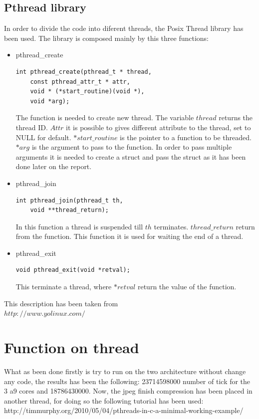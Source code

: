 \documentclass[journal]{IEEEtran}
\begin{document}
\subsection{Pthread library}
In order to divide the code into diferent threads, the Posix Thread library has been used.
The library is composed mainly by this three functions:
\begin{itemize}
	\item pthread\_create	
\begin{lstlisting}
int pthread_create(pthread_t * thread,
	const pthread_attr_t * attr,
	void * (*start_routine)(void *), 
	void *arg);
\end{lstlisting}

The function is needed to create new thread. 
The variable \(thread\) returns the thread ID. \(Attr\) it is possible to gives different attribute to the thread, set to NULL for default.
\(*start\_routine\) is the pointer to a function to be threaded. 
\(*arg\) is the argument to pass to the function. In order to pass multiple arguments it is needed to create a struct and pass the struct as it has been done later on the report.\\

	\item pthread\_join
\begin{lstlisting}
int pthread_join(pthread_t th, 
	void **thread_return);
\end{lstlisting}
In this function a thread is suspended till \(th\) terminates. \(thread\_return\) return from the function.
This function it is used for waiting the end of a thread.
	\item pthread\_exit
\begin{lstlisting}
void pthread_exit(void *retval);
\end{lstlisting}
This terminate a thread, where \(*retval\) return the value of the function.
\end{itemize}
This description has been taken from\\
 \(http://www.yolinux.com/\)



\section{Function on thread}

What as been done firstly is try to run on the two architecture without change any code, the results has been the following:
23714598000 number of tick for the 3 a9 cores and 18786430000. 
Now, the jpeg finish compression has been placed in another thread, for doing so the following tutorial has been used: http://timmurphy.org/2010/05/04/pthreads-in-c-a-minimal-working-example/
\end{document}
